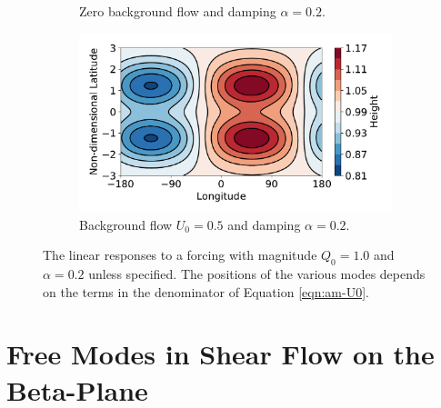 \begin{figure}
\begin{subfigure}[t]{0.30\textwidth}
    \caption{Zero background flow and damping $\alpha = 0.2$.}
    \label{fig:eigenvalue-dominates-shift}
  \end{subfigure}
  \quad
  \begin{subfigure}[t]{0.30\textwidth}
    \includegraphics[width=1.0\textwidth]{figures/wave-mean-flow/beta-flow.pdf}
    \caption{Background flow $U_{0}=0.5$ and damping $\alpha = 0.2$.}
    \label{fig:flow-dominates-shift}
  \end{subfigure}
  \caption{The linear responses to a forcing  with magnitude $Q_{0}=1.0$ and $\alpha=0.2$ unless specified. The positions of the various modes depends on the terms in the denominator of Equation \ref{eqn:am-U0}.}
  \label{fig:U0-shift-demo}
\end{figure}








\section{Free Modes in Shear Flow on the Beta-Plane}\label{sec:shear-flow-beta-plane}

